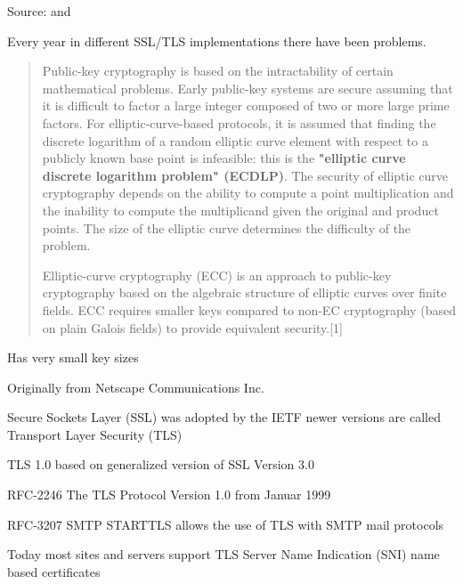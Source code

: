 \documentclass[Screen16to9,17pt]{foils}
\begin{document}


Source:  and \\

Every year in different SSL/TLS implementations there have been problems.





\begin{quote}
  Public-key cryptography is based on the intractability of certain mathematical problems. Early public-key systems are secure assuming that it is difficult to factor a large integer composed of two or more large prime factors. For elliptic-curve-based protocols, it is assumed that finding the discrete logarithm of a random elliptic curve element with respect to a publicly known base point is infeasible: this is the {\bf "elliptic curve discrete logarithm problem" (ECDLP)}. The security of elliptic curve cryptography depends on the ability to compute a point multiplication and the inability to compute the multiplicand given the original and product points. The size of the elliptic curve determines the difficulty of the problem.

Elliptic-curve cryptography (ECC) is an approach to public-key cryptography based on the algebraic structure of elliptic curves over finite fields. ECC requires smaller keys compared to non-EC cryptography (based on plain Galois fields) to provide equivalent security.[1]
\end{quote}

\begin{list2}
\item {}
\item Has very small key sizes
\end{list2}






\begin{list1}
\item Originally from Netscape Communications Inc.
\item Secure Sockets Layer (SSL) was adopted by the IETF newer versions are called
Transport Layer Security (TLS)
\item TLS 1.0 based on generalized version of SSL Version 3.0
\item RFC-2246 The TLS Protocol Version 1.0 from Januar 1999
\item RFC-3207 SMTP STARTTLS allows the use of TLS with SMTP mail protocols
\item Today most sites and servers support TLS Server Name Indication (SNI) name based certificates
\end{list1}
\end{document}
